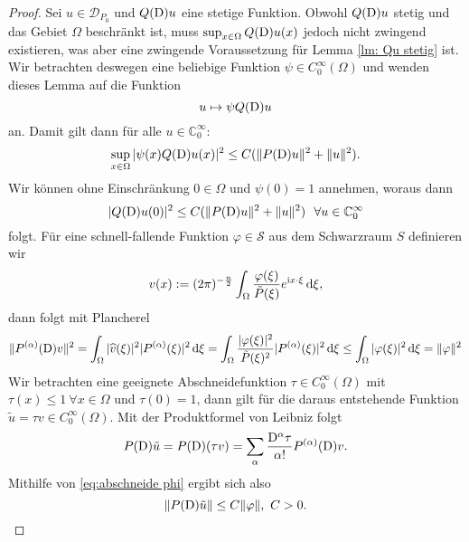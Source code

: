 \begin{proof}
Sei $u \in \mathcal{D}_{P_0}$ und $Q(\mathrm D)u$ eine stetige Funktion. Obwohl $Q(\mathrm D)u$ stetig und das Gebiet $\Omega$ beschränkt ist, muss $\sup_{x \in \Omega} Q(\mathrm D)u(x)$ jedoch nicht zwingend existieren, was aber eine zwingende Voraussetzung für Lemma \ref{lm: Qu stetig} ist. Wir betrachten deswegen eine beliebige Funktion $\psi \in C_0^{\infty} (\Omega)$ und wenden dieses Lemma auf die Funktion
\begin{equation}
u \mapsto  \psi Q(\mathrm D) u
\end{equation}
an. Damit gilt dann für alle $u \in \mathbb{C}_0^{\infty}$:
\begin{equation}
\sup_{x \in \Omega} | \psi(x) Q(\mathrm D)u(x)|^2 \leq C ( \Vert  P(\mathrm D)u\Vert^2 + \Vert u\Vert^2 ).
\end{equation}
Wir können ohne Einschränkung $0 \in \Omega$ und $\psi(0)=1$  annehmen, woraus dann 
\begin{equation}\label{eq:abschneide null}
|Q(\D)u(0)|^2 \leq C( \Vert  P(\D)u\Vert^2 + \Vert u\Vert^2 ) \ \  \forall u \in \mathbb{C}_0^{\infty}
\end{equation}
folgt. Für eine schnell-fallende Funktion $ \varphi \in \mathcal{S}$ aus dem Schwarzraum $S$ definieren wir
\begin{equation}
v(x):= (2 \pi)^{-\frac{n}{2}} \int_{\Omega} \frac{\varphi (\xi)}{\tilde{P}(\xi)}e^{\mathrm i x \cdot \xi} \,\mathrm d \xi,
\end{equation}
dann folgt mit Plancherel
\begin{equation}\label{eq:abschneide phi}
\Vert P^{(\alpha)}(\mathrm D)v \Vert^2 = \int_{\Omega} |\widehat{v}(\xi)|^2 |P^{(\alpha)}(\xi)|^2 \,\mathrm d \xi = \int_{\Omega} \frac{|\varphi(\xi)|^2}{\tilde{P}(\xi)^2} | P^{(\alpha)} (\xi)|^2 \,\mathrm d \xi \leq \int_{\Omega} |\varphi(\xi)|^2 \,\mathrm d \xi= \Vert \varphi \Vert^2
\end{equation}
Wir betrachten eine geeignete Abschneidefunktion $\tau \in C_0^{\infty}(\Omega)$ mit $\tau(x) \leq 1 \ \forall x \in \Omega$ und $\tau(0)=1$, dann gilt für die daraus entstehende Funktion $\tilde{u} = \tau v \in C_0^{\infty}(\Omega)$.
Mit der Produktformel von Leibniz folgt
\begin{equation}
P(\mathrm D)\tilde{u} = P(\mathrm D)(\tau v) = \sum_{\alpha} \frac{\mathrm D^{\alpha} \tau}{\alpha !} P^{(\alpha)}(\mathrm D) v.
\end{equation}
Mithilfe von \eqref{eq:abschneide phi} ergibt sich also
\begin{equation}\label{eq:abschatz phi}
\Vert P(\D) \tilde{u} \Vert \leq C \Vert \varphi \Vert, \ C>0.

\end{equation}
\end{proof}
